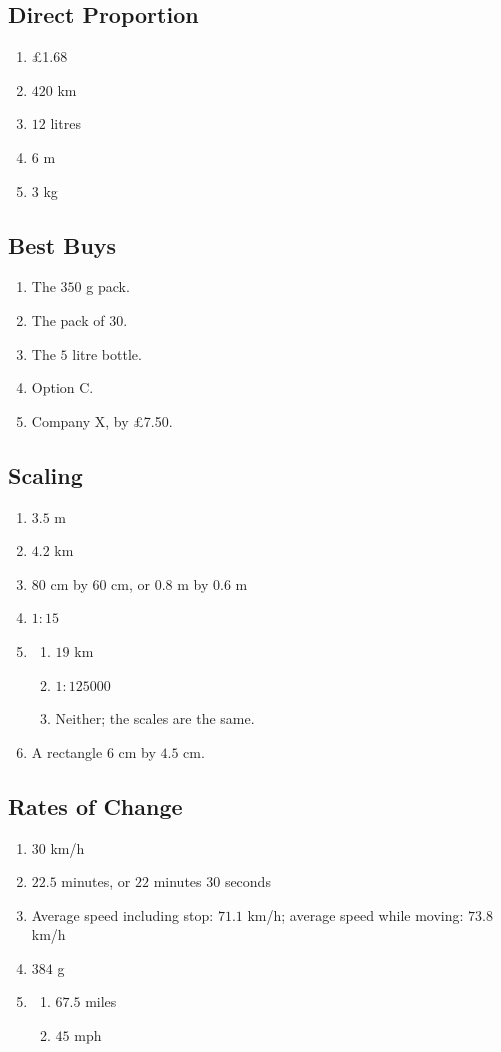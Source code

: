 \documentclass[12pt,a4paper]{article}
\begin{document}
\subsection*{Direct Proportion}
\begin{enumerate}
\item \pounds1.68
\item \(420\) km
\item \(12\) litres
\item \(6\) m
\item \(3\) kg
\end{enumerate}

\subsection*{Best Buys}
\begin{enumerate}
\item The \(350\) g pack.
\item The pack of \(30\).
\item The \(5\) litre bottle.
\item Option C.
\item Company X, by \pounds7.50.
\end{enumerate}

\subsection*{Scaling}
\begin{enumerate}
\item \(3.5\) m
\item \(4.2\) km
\item \(80\) cm by \(60\) cm, or \(0.8\) m by \(0.6\) m
\item \(1:15\)
\item \begin{enumerate}[label=(\alph*)]
\item \(19\) km
\item \(1:125000\)
\item Neither; the scales are the same.
\end{enumerate}
\item A rectangle \(6\) cm by \(4.5\) cm.
\end{enumerate}

\subsection*{Rates of Change}
\begin{enumerate}
\item \(30\) km/h
\item \(22.5\) minutes, or \(22\) minutes \(30\) seconds
\item Average speed including stop: \(71.1\) km/h; average speed while moving: \(73.8\) km/h
\item \(384\) g
\item \begin{enumerate}[label=(\alph*)]
\item \(67.5\) miles
\item \(45\) mph
\end{enumerate}
\end{enumerate}
\end{document}
